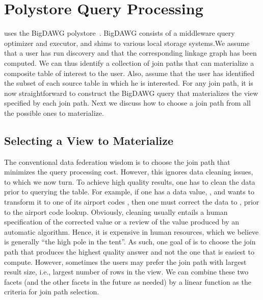 \section{Polystore Query Processing}
\label{sec:curating}

\dcv uses the BigDAWG polystore~\cite{DBLP:journals/pvldb/ElmoreDSBCGHHKK15}. BigDAWG  consists of a middleware query optimizer and executor, and shims to various local storage systems.We assume that a user has run discovery and that the corresponding linkage graph has been computed. We can thus identify a collection of join paths that can materialize a composite table of interest to the user. Also, assume that the user has identified the subset of each source table in which he is interested. For any join path, it is now straightforward to construct the BigDAWG query that materializes the view specified by each join path. Next we discuss how to choose a join path from all the possible ones to materialize.




\subsection{Selecting a View to Materialize}

The conventional data federation wisdom is to choose the join path that minimizes the query processing cost. However, this ignores data cleaning issues, to which we now turn. To achieve high quality results, one has to clean the data prior to querying the table. For example, if one has a data value, , and wants to transform it to one of its airport codes , then one must correct the data to , prior to the airport code lookup. Obviously, cleaning usually entails a human specification of the corrected value or a review of the value produced by an automatic algorithm. Hence, it is expensive in human resources, which we believe is generally ``the high pole in the tent''. As such, one goal of \dcv is to choose the join path that produces the highest quality answer and not the one that is easiest to compute. However, sometimes the users may prefer the join path with largest result size, i.e., largest number of rows in the view. We can combine these two facets (and the other facets in the future as needed) by a linear function as the criteria for join path selection.


